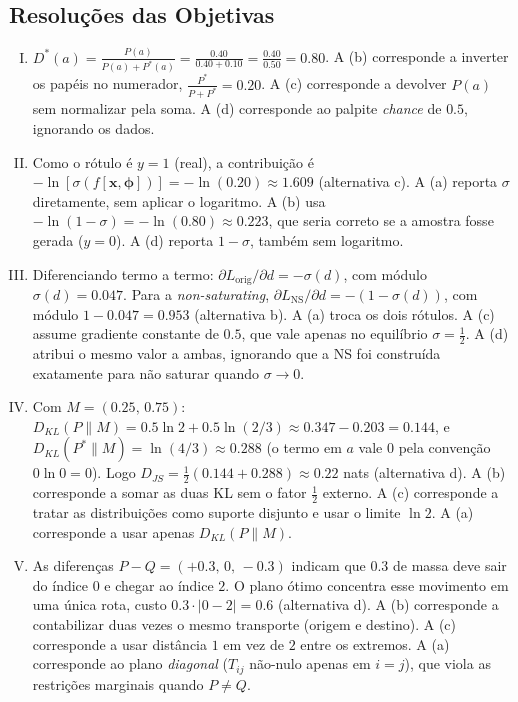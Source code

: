 \documentclass{dlproblemset}
\begin{document}
\subsection*{Resoluções das Objetivas}
\color{blue}
\begin{enumerate}[I)]
    \item $D^{*}(a) = \tfrac{P(a)}{P(a) + P^{*}(a)} = \tfrac{0.40}{0.40 + 0.10} = \tfrac{0.40}{0.50} = 0.80$. A (b) corresponde a inverter os papéis no numerador, $\tfrac{P^{*}}{P + P^{*}} = 0.20$. A (c) corresponde a devolver $P(a)$ sem normalizar pela soma. A (d) corresponde ao palpite \emph{chance} de $0.5$, ignorando os dados.

    \item Como o rótulo é $y = 1$ (real), a contribuição é $-\ln[\sigma(f[\mathbf{x},\boldsymbol{\phi}])] = -\ln(0.20) \approx 1.609$ (alternativa c). A (a) reporta $\sigma$ diretamente, sem aplicar o logaritmo. A (b) usa $-\ln(1 - \sigma) = -\ln(0.80) \approx 0.223$, que seria correto se a amostra fosse gerada ($y = 0$). A (d) reporta $1 - \sigma$, também sem logaritmo.

    \item Diferenciando termo a termo: $\partial L_{\text{orig}}/\partial d = -\sigma(d)$, com módulo $\sigma(d) = 0.047$. Para a \textit{non-saturating}, $\partial L_{\text{NS}}/\partial d = -(1 - \sigma(d))$, com módulo $1 - 0.047 = 0.953$ (alternativa b). A (a) troca os dois rótulos. A (c) assume gradiente constante de $0.5$, que vale apenas no equilíbrio $\sigma = \tfrac{1}{2}$. A (d) atribui o mesmo valor a ambas, ignorando que a NS foi construída exatamente para não saturar quando $\sigma \to 0$.

    \item Com $M = (0.25,\, 0.75)$: $D_{KL}(P\|M) = 0.5\ln 2 + 0.5\ln(2/3) \approx 0.347 - 0.203 = 0.144$, e $D_{KL}(P^{*}\|M) = \ln(4/3) \approx 0.288$ (o termo em $a$ vale $0$ pela convenção $0\ln 0 = 0$). Logo $D_{JS} = \tfrac{1}{2}(0.144 + 0.288) \approx 0.22$ nats (alternativa d). A (b) corresponde a somar as duas KL sem o fator $\tfrac{1}{2}$ externo. A (c) corresponde a tratar as distribuições como suporte disjunto e usar o limite $\ln 2$. A (a) corresponde a usar apenas $D_{KL}(P\|M)$.

    \item As diferenças $P - Q = (+0.3,\, 0,\, -0.3)$ indicam que $0.3$ de massa deve sair do índice $0$ e chegar ao índice $2$. O plano ótimo concentra esse movimento em uma única rota, custo $0.3 \cdot |0 - 2| = 0.6$ (alternativa d). A (b) corresponde a contabilizar duas vezes o mesmo transporte (origem e destino). A (c) corresponde a usar distância $1$ em vez de $2$ entre os extremos. A (a) corresponde ao plano \emph{diagonal} ($T_{ij}$ não-nulo apenas em $i = j$), que viola as restrições marginais quando $P \neq Q$.


\end{enumerate}
\end{document}
